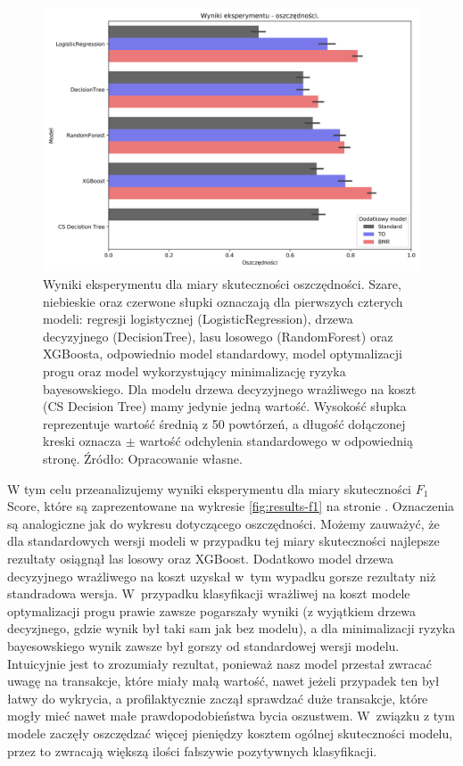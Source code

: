 \documentclass[inzynierska]{pwr_wmat_praca_dyplomowa}
\theoremstyle{plain}
\numberwithin{theorem}{chapter}
\theoremstyle{definition}
\numberwithin{theorem}{chapter}
\begin{document}
\begin{figure}
	\includegraphics[width=\linewidth]{images/100_config1-Savings.png}
	\caption{Wyniki eksperymentu dla miary skuteczności oszczędności. Szare, niebieskie oraz czerwone słupki oznaczają dla pierwszych czterych modeli: regresji logistycznej (LogisticRegression), drzewa decyzyjnego (DecisionTree), lasu losowego (RandomForest) oraz XGBoosta, odpowiednio model standardowy, model optymalizacji progu oraz model wykorzystujący minimalizację ryzyka bayesowskiego. Dla modelu drzewa decyzyjnego wrażliwego na koszt (CS Decision Tree) mamy jedynie jedną wartość. Wysokość słupka reprezentuje wartość średnią z 50 powtórzeń, a długość dołączonej kreski oznacza $\pm$ wartość odchylenia standardowego w odpowiednią stronę. Źródło: Opracowanie własne.}
	\label{fig:results-savings}
\end{figure}

W tym celu przeanalizujemy wyniki eksperymentu dla miary skuteczności $F_1$ Score, które są zaprezentowane na wykresie \ref{fig:results-f1} na stronie \pageref{fig:results-savings}. Oznaczenia są analogiczne jak do wykresu dotyczącego oszczędności. Możemy zauważyć, że dla standardowych wersji modeli w przypadku tej miary skuteczności najlepsze rezultaty osiągnął las losowy oraz XGBoost. Dodatkowo model drzewa decyzyjnego wrażliwego na koszt uzyskał w~tym wypadku gorsze rezultaty niż standradowa wersja. W~przypadku klasyfikacji wrażliwej na koszt modele optymalizacji progu prawie zawsze pogarszały wyniki (z wyjątkiem drzewa decyzjnego, gdzie wynik był taki sam jak bez modelu), a dla minimalizacji ryzyka bayesowskiego wynik zawsze był gorszy od standardowej wersji modelu. Intuicyjnie jest to zrozumiały rezultat, ponieważ nasz model przestał zwracać uwagę na transakcje, które miały małą wartość, nawet jeżeli przypadek ten był łatwy do wykrycia, a profilaktycznie zaczął sprawdzać duże transakcje, które mogły mieć nawet małe prawdopodobieństwa bycia oszustwem. W~związku z tym modele zaczęły oszczędzać więcej pieniędzy kosztem ogólnej skuteczności modelu, przez to zwracają większą ilości fałszywie pozytywnych klasyfikacji. 
\end{document}

